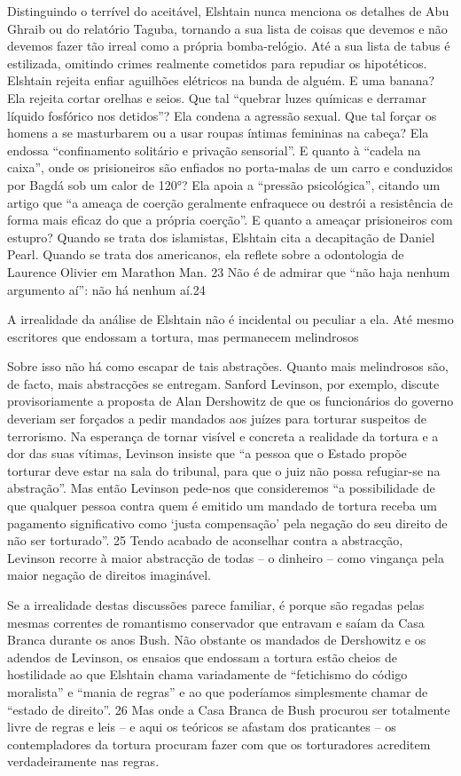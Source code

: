 Distinguindo o terrível do aceitável, Elshtain nunca menciona os detalhes de Abu Ghraib ou do relatório Taguba, tornando a sua lista de coisas que devemos e não devemos fazer tão irreal como a própria bomba-relógio. Até a sua lista de tabus é estilizada, omitindo crimes realmente cometidos para repudiar os hipotéticos. Elshtain rejeita enfiar aguilhões elétricos na bunda de alguém. E uma banana? Ela rejeita cortar orelhas e seios. Que tal “quebrar luzes químicas e derramar líquido fosfórico nos detidos”? Ela condena a agressão sexual. Que tal forçar os homens a se masturbarem ou a usar roupas íntimas femininas na cabeça? Ela endossa “confinamento solitário e privação sensorial”. E quanto à “cadela na caixa”, onde os prisioneiros são enfiados no porta-malas de um carro e conduzidos por Bagdá sob um calor de 120°? Ela apoia a “pressão psicológica”, citando um artigo que “a ameaça de coerção geralmente enfraquece ou destrói a resistência de forma mais eficaz do que a própria coerção”. E quanto a ameaçar prisioneiros com estupro? Quando se trata dos islamistas, Elshtain cita a decapitação de Daniel Pearl. Quando se trata dos americanos, ela reflete sobre a odontologia de Laurence Olivier em Marathon Man. {\color{blue}23} Não é de admirar que “não haja nenhum argumento aí”: não há nenhum aí.{\color{blue}24}
 \par 
A irrealidade da análise de Elshtain não é incidental ou peculiar a ela. Até mesmo escritores que endossam a tortura, mas permanecem melindrosos
 \par 
Sobre isso não há como escapar de tais abstrações. Quanto mais melindrosos são, de facto, mais abstracções se entregam. Sanford Levinson, por exemplo, discute provisoriamente a proposta de Alan Dershowitz de que os funcionários do governo deveriam ser forçados a pedir mandados aos juízes para torturar suspeitos de terrorismo. Na esperança de tornar visível e concreta a realidade da tortura e a dor das suas vítimas, Levinson insiste que “a pessoa que o Estado propõe torturar deve estar na sala do tribunal, para que o juiz não possa refugiar-se na abstração”. Mas então Levinson pede-nos que consideremos “a possibilidade de que qualquer pessoa contra quem é emitido um mandado de tortura receba um pagamento significativo como ‘justa compensação’ pela negação do seu direito de não ser torturado”. {\color{blue}25} Tendo acabado de aconselhar contra a abstracção, Levinson recorre à maior abstracção de todas – o dinheiro – como vingança pela maior negação de direitos imaginável.
 \par 
Se a irrealidade destas discussões parece familiar, é porque são regadas pelas mesmas correntes de romantismo conservador que entravam e saíam da Casa Branca durante os anos Bush. Não obstante os mandados de Dershowitz e os adendos de Levinson, os ensaios que endossam a tortura estão cheios de hostilidade ao que Elshtain chama variadamente de “fetichismo do código moralista” e “mania de regras” e ao que poderíamos simplesmente chamar de “estado de direito”. {\color{blue}26} Mas onde a Casa Branca de Bush procurou ser totalmente livre de regras e leis – e aqui os teóricos se afastam dos praticantes – os contempladores da tortura procuram fazer com que os torturadores acreditem verdadeiramente nas regras.
